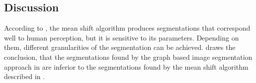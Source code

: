 \subsection{Discussion}%
\label{subsec:traditional-approaches-discussion}%
According to \cite{pantofaru2005comparison}, the mean shift algorithm produces
segmentations that correspond well to human perception, but it is sensitive to
its parameters. Depending on them, different granularities of the segmentation
can be achieved. \cite{pantofaru2005comparison} draws the conclusion, that
the segmentations found by the graph based image segmentation approach
in \cite{felzenszwalb2004efficient} are inferior to the segmentations found
by the mean shift algorithm described in \cite{comaniciu2002mean}.
